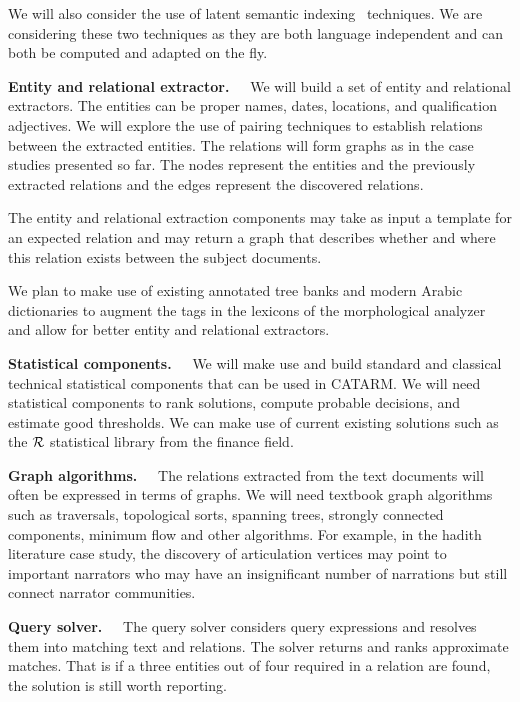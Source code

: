 \documentclass[12pt]{article}
\begin{document}
We will also consider the use of
latent semantic indexing~\cite{LSI89} techniques. 
We are considering these two techniques as they are 
both language independent and can both be computed and
adapted on the fly.

{\bf Entity and relational extractor.~~}
We will build a set of entity and relational extractors. 
The entities can be proper names, dates, locations,
and qualification adjectives. 
We will explore the use of pairing techniques to establish 
relations between the extracted entities.
The relations will form graphs as in the case studies presented
so far. The nodes represent the entities and the previously 
extracted relations and the edges represent the discovered 
relations.

The entity and relational extraction components 
may take as input a template for an expected relation and 
may return a graph that describes whether and where 
this relation exists between the subject documents.

We plan to make use of existing annotated tree banks and
modern Arabic dictionaries
to augment the tags in the lexicons of the 
morphological analyzer and allow for better entity and relational
extractors. 

{\bf Statistical components.~~}
We will make use and build standard and classical technical 
statistical components that can be used in CATARM. 
We will need statistical components to rank solutions, compute 
probable decisions, and estimate good thresholds. 
We can make use of current existing solutions such as the 
${\cal R}$ statistical library from the finance field.

{\bf Graph algorithms.~~}
The relations extracted from the text documents will often 
be expressed in terms of graphs.
We will need textbook graph algorithms such as traversals, 
topological sorts, spanning trees, strongly connected 
components, minimum flow  and other algorithms.
For example, in the hadith literature case study, the discovery
of articulation vertices may point to important narrators 
who may have an insignificant number of narrations 
but still connect narrator communities.

{\bf Query solver.~~}
The query solver considers query expressions and resolves them 
into matching text and relations. 
The solver returns and ranks approximate matches.
That is if a three entities out of four required in a relation are
found, the solution is still worth reporting. 
\end{document}
